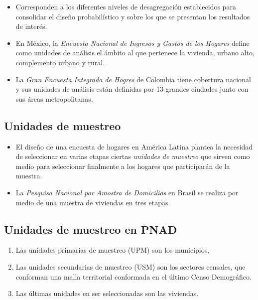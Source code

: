 \documentclass[
]{article}
\providecommand{\tightlist}{%
  \setlength{\itemsep}{0pt}\setlength{\parskip}{0pt}}
\begin{document}
\begin{itemize}
\tightlist
\item
  Corresponden a los diferentes niveles de desagregación establecidos
  para consolidar el diseño probabilístico y sobre los que se presentan
  los resultados de interés.
\item
  En México, la \emph{Encuesta Nacional de Ingresos y Gastos de los
  Hogares} define como unidades de análisis el ámbito al que pertenece
  la vivienda, urbano alto, complemento urbano y rural.
\item
  La \emph{Gran Encuesta Integrada de Hogres} de Colombia tiene
  cobertura nacional y sus unidades de análisis están definidas por 13
  grandes ciudades junto con sus áreas metropolitanas.
\end{itemize}

\hypertarget{unidades-de-muestreo}{%
\subsection{Unidades de muestreo}\label{unidades-de-muestreo}}

\begin{itemize}
\item
  El diseño de una encuesta de hogares en América Latina plantea la
  necesidad de seleccionar en varias etapas ciertas \emph{unidades de
  muestreo} que sirven como medio para seleccionar finalmente a los
  hogares que participarán de la muestra.
\item
  La \emph{Pesquisa Nacional por Amostra de Domicilios} en Brasil se
  realiza por medio de una muestra de viviendas en tres etapas.
\end{itemize}

\hypertarget{unidades-de-muestreo-en-pnad}{%
\subsection{Unidades de muestreo en
PNAD}\label{unidades-de-muestreo-en-pnad}}

\begin{enumerate}
\def\labelenumi{\arabic{enumi}.}
\tightlist
\item
  Las unidades primarias de muestreo (UPM) son los municipios,
\item
  Las unidades secundarias de muestreo (USM) son los sectores censales,
  que conforman una malla territorial conformada en el último Censo
  Demográfico.
\item
  Las últimas unidades en ser seleccionadas son las viviendas.
\end{enumerate}
\end{document}
